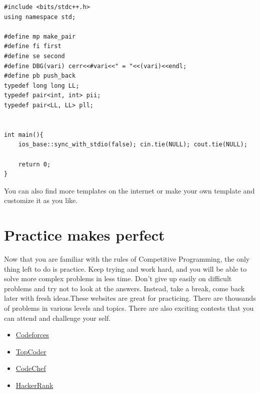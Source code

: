 \documentclass[12pt, a4paper]{article}
\begin{document}
\begin{lstlisting}
#include <bits/stdc++.h>
using namespace std;

#define mp make_pair
#define fi first
#define se second
#define DBG(vari) cerr<<#vari<<" = "<<(vari)<<endl;
#define pb push_back
typedef long long LL;
typedef pair<int, int> pii;
typedef pair<LL, LL> pll;

 
int main(){
    ios_base::sync_with_stdio(false); cin.tie(NULL); cout.tie(NULL);

    return 0;
}
\end{lstlisting}

You can also find more templates on the internet or make your own template and customize it as you like.

\section{Practice makes perfect}
Now that you are familiar with the rules of Competitive Programming, the only thing left to do is practice. Keep trying and work hard, and you will be able to solve more complex problems in less time. Don't give up easily on difficult problems and try not to look at the answers. Instead, take a break, come back later with fresh ideas.These websites are great for practicing. There are thousands of problems in various levels and topics. There are also exciting contests that you can attend and challenge your self.
\begin{itemize}
\item \href{https://codeforces.com/}{Codeforces}
\item \href{https://www.topcoder.com/}{TopCoder}
\item \href{https://www.codechef.com/}{CodeChef}
\item \href{https://www.hackerrank.com/}{HackerRank}
\end{itemize}
\end{document}
